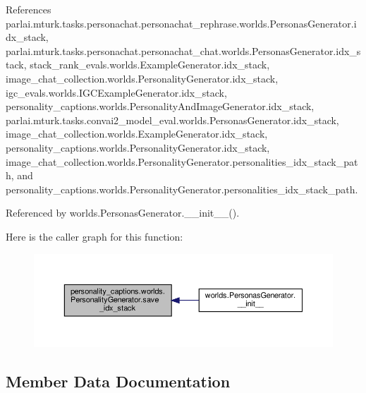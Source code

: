 References parlai.\+mturk.\+tasks.\+personachat.\+personachat\+\_\+rephrase.\+worlds.\+Personas\+Generator.\+idx\+\_\+stack, parlai.\+mturk.\+tasks.\+personachat.\+personachat\+\_\+chat.\+worlds.\+Personas\+Generator.\+idx\+\_\+stack, stack\+\_\+rank\+\_\+evals.\+worlds.\+Example\+Generator.\+idx\+\_\+stack, image\+\_\+chat\+\_\+collection.\+worlds.\+Personality\+Generator.\+idx\+\_\+stack, igc\+\_\+evals.\+worlds.\+I\+G\+C\+Example\+Generator.\+idx\+\_\+stack, personality\+\_\+captions.\+worlds.\+Personality\+And\+Image\+Generator.\+idx\+\_\+stack, parlai.\+mturk.\+tasks.\+convai2\+\_\+model\+\_\+eval.\+worlds.\+Personas\+Generator.\+idx\+\_\+stack, image\+\_\+chat\+\_\+collection.\+worlds.\+Example\+Generator.\+idx\+\_\+stack, personality\+\_\+captions.\+worlds.\+Personality\+Generator.\+idx\+\_\+stack, image\+\_\+chat\+\_\+collection.\+worlds.\+Personality\+Generator.\+personalities\+\_\+idx\+\_\+stack\+\_\+path, and personality\+\_\+captions.\+worlds.\+Personality\+Generator.\+personalities\+\_\+idx\+\_\+stack\+\_\+path.



Referenced by worlds.\+Personas\+Generator.\+\_\+\+\_\+init\+\_\+\+\_\+().

Here is the caller graph for this function\+:
\nopagebreak
\begin{figure}[H]
\begin{center}
\leavevmode
\includegraphics[width=350pt]{classpersonality__captions_1_1worlds_1_1PersonalityGenerator_a6234b41cdaf670fa367723cce5a47b8b_icgraph}
\end{center}
\end{figure}


\subsection{Member Data Documentation}
\mbox{\label{classpersonality__captions_1_1worlds_1_1PersonalityGenerator_a75a92b71d3b65ebf571421dfc18d8d0c}} 
